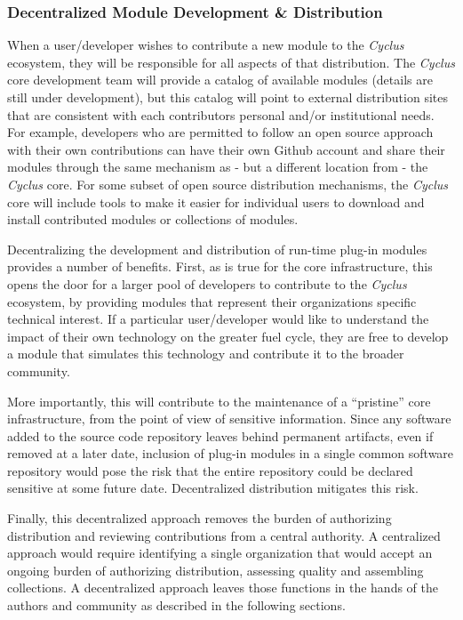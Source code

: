 \documentclass[letterpaper,10pt,english]{sphinxmanual}
\begin{document}
\subsubsection{Decentralized Module Development \& Distribution}
\label{basics/ecosystem:decentralized-module-development-distribution}
When a user/developer wishes to contribute a new module to the
\emph{Cyclus} ecosystem, they will be responsible for all aspects of that
distribution.  The \emph{Cyclus} core development team will provide a
catalog of available modules (details are still under development),
but this catalog will point to external distribution sites that are
consistent with each contributors personal and/or institutional needs.
For example, developers who are permitted to follow an open source
approach with their own contributions can have their own Github
account and share their modules through the same mechanism as - but a
different location from - the \emph{Cyclus} core.  For some subset of open
source distribution mechanisms, the \emph{Cyclus} core will include tools
to make it easier for individual users to download and install
contributed modules or collections of modules.

Decentralizing the development and distribution of run-time plug-in
modules provides a number of benefits.  First, as is true for the core
infrastructure, this opens the door for a larger pool of developers to
contribute to the \emph{Cyclus} ecosystem, by providing modules that
represent their organizations specific technical interest.  If a
particular user/developer would like to understand the impact of their
own technology on the greater fuel cycle, they are free to develop a
module that simulates this technology and contribute it to the broader
community.

More importantly, this will contribute to the maintenance of a
``pristine'' core infrastructure, from the point of view of sensitive
information.  Since any software added to the source code repository
leaves behind permanent artifacts, even if removed at a later date,
inclusion of plug-in modules in a single common software repository
would pose the risk that the entire repository could be declared
sensitive at some future date.  Decentralized distribution mitigates
this risk.

Finally, this decentralized approach removes the burden of authorizing
distribution and reviewing contributions from a central authority.  A
centralized approach would require identifying a single organization
that would accept an ongoing burden of authorizing distribution,
assessing quality and assembling collections.  A decentralized
approach leaves those functions in the hands of the authors and
community as described in the following sections.
\end{document}
